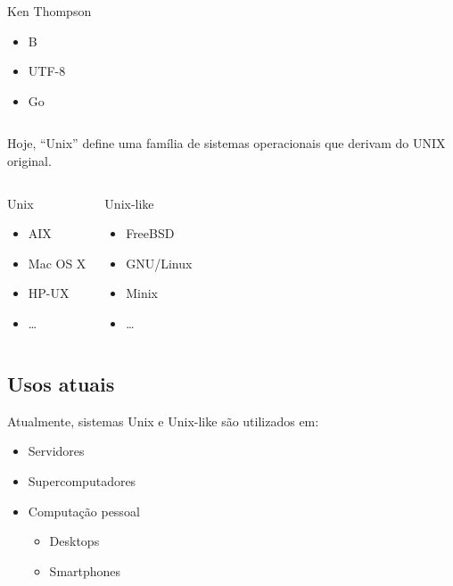 \documentclass{beamer}
\begin{document}
\begin{frame}
\begin{columns}
\begin{block}{Ken Thompson}
      \begin{itemize}
      \item B
      \item UTF-8
      \item Go
      \end{itemize}

    \end{block}
  \end{columns}
\end{frame}

\begin{frame}

  Hoje, ``Unix'' define uma família de sistemas operacionais que derivam
  do UNIX original.

  \begin{columns}

    
    \begin{block}{Unix}
      \begin{itemize}
      \item AIX
      \item Mac OS X
      \item HP-UX
      \item \ldots
      \end{itemize}
    \end{block}


    \begin{block}{Unix-like}
      \begin{itemize}
      \item FreeBSD
      \item GNU/Linux
      \item Minix
      \item \ldots
      \end{itemize}
    \end{block}

  \end{columns}

\end{frame}

\subsection{Usos atuais}

\begin{frame}
  
  Atualmente, sistemas Unix e Unix-like são utilizados em:

  \begin{itemize}
  \item Servidores
  \item Supercomputadores
  \item Computação pessoal
    \begin{itemize}
    \item Desktops
    \item Smartphones
    \end{itemize}
  \end{itemize}

\end{frame}
\end{document}
